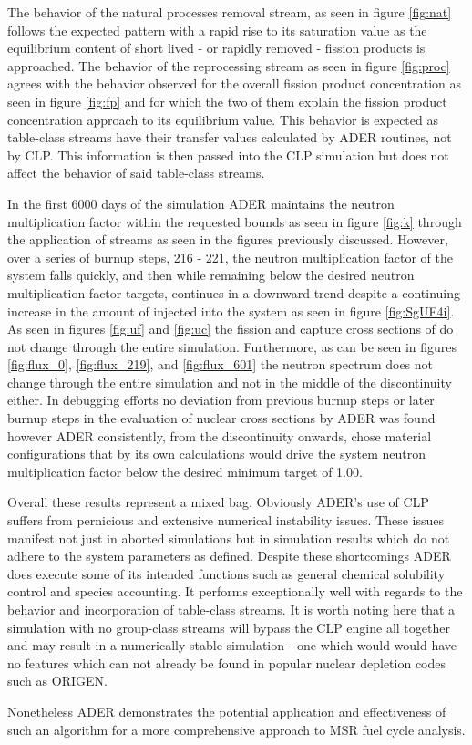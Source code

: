 The behavior of the natural processes removal stream, as seen in figure
\ref{fig:nat} follows the expected pattern with a rapid rise to its
saturation value as the equilibrium content of short lived - or rapidly removed
- fission products is approached. The behavior of the reprocessing stream as 
seen in figure \ref{fig:proc} agrees with the behavior observed for the overall
fission product concentration as seen in figure \ref{fig:fp} and for which the
two of them explain the fission product concentration approach to its
equilibrium value. This behavior is expected as table-class streams 
have their transfer values calculated by ADER routines, not by CLP. This
information is then passed into the CLP simulation but does not affect
the behavior of said table-class streams.

In the first 6000 days of the simulation ADER maintains the neutron
multiplication factor within the requested bounds as seen in figure \ref{fig:k}
through the application of streams as seen in the figures previously 
discussed. However, over a series of burnup steps, 216 - 221, the
neutron multiplication factor of the system falls quickly, and then while
remaining below the desired neutron multiplication factor targets, continues
in a downward trend despite a continuing increase in the amount of 
injected into the system as seen in figure \ref{fig:SgUF4i}. As seen in figures
\ref{fig:uf} and \ref{fig:uc} the fission and capture cross sections of 
 do not change through the entire simulation. Furthermore, as
can be seen in figures \ref{fig:flux_0}, \ref{fig:flux_219}, and 
\ref{fig:flux_601} the neutron spectrum does not change through the entire 
simulation and not in the middle of the discontinuity either. In debugging
efforts no deviation from previous burnup steps or later burnup steps
in the evaluation of nuclear cross sections by ADER was found however ADER
consistently, from the discontinuity onwards, chose material configurations
that by its own calculations would drive the system neutron multiplication
factor below the desired minimum target of 1.00.

Overall these results represent a mixed bag. Obviously ADER's use of CLP suffers
from pernicious and extensive numerical instability issues. These issues
manifest not just in aborted simulations but in simulation results which 
do not adhere to the system parameters as defined. Despite these shortcomings
ADER does execute some of its intended functions such as general chemical
solubility control and species accounting. It performs exceptionally well
with regards to the behavior and incorporation of table-class streams.
It is worth noting here that a simulation with no group-class streams will
bypass the CLP engine all together and may result in a numerically stable
simulation - one which would would have no features which can not already be
found in popular nuclear depletion codes such as ORIGEN. 

Nonetheless ADER demonstrates the potential application and effectiveness of
such an algorithm for a more comprehensive approach to MSR fuel cycle
analysis.
 
